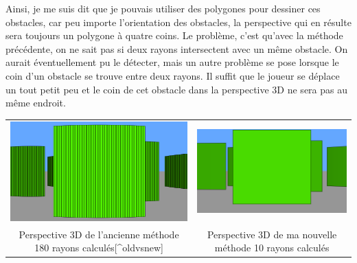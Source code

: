 \documentclass[11pt,french,a4paper,]{article}
\begin{document}
Ainsi, je me suis dit que je pouvais utiliser des polygones pour
dessiner ces obstacles, car peu importe l'orientation des obstacles, la
perspective qui en résulte sera toujours un polygone à quatre coins. Le
problème, c'est qu'avec la méthode précédente, on ne sait pas si deux
rayons intersectent avec un même obstacle. On aurait éventuellement pu
le détecter, mais un autre problème se pose lorsque le coin d'un
obstacle se trouve entre deux rayons. Il suffit que le joueur se déplace
un tout petit peu et le coin de cet obstacle dans la perspective 3D ne
sera pas au même endroit.

\begin{longtable}[]{@{}cc@{}}
\toprule
\endhead
\begin{minipage}[t]{0.47\columnwidth}\centering
\includegraphics{../img/OldVSNew/VS_Old.png}\strut
\end{minipage} & \begin{minipage}[t]{0.47\columnwidth}\centering
\includegraphics{../img/OldVSNew/VS_New.png}\strut
\end{minipage}\tabularnewline
\begin{minipage}[t]{0.47\columnwidth}\centering
Perspective 3D de l'ancienne méthode 180 rayons
calculés{[}\^{}oldvsnew{]}\strut
\end{minipage} & \begin{minipage}[t]{0.47\columnwidth}\centering
Perspective 3D de ma nouvelle méthode 10 rayons calculés\strut
\end{minipage}\tabularnewline
\bottomrule
\end{longtable}
\end{document}
